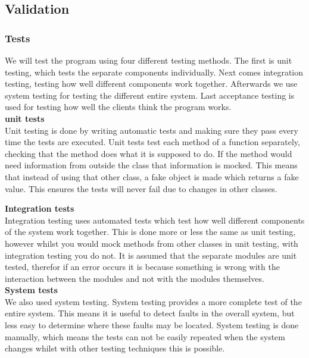 \subsection{Validation}

\subsubsection{Tests}
We will test the program using four different testing methods. The first is unit testing, which tests the separate components individually. Next comes integration testing, testing how well different components work together. Afterwards we use system testing for testing the different entire system. Last acceptance testing is used for testing how well the clients think the program works.\\

\textbf{unit tests}\\
Unit testing is done by writing automatic tests and making sure they pass every time the tests are executed. Unit tests test each method of a function separately, checking that the method does what it is supposed to do. If the method would need information from outside the class that information is mocked. This means that instead of using that other class, a fake object is made which returns a fake value. This ensures the tests will never fail due to changes in other classes. \\

\todo{}

\textbf{Integration tests}\\
Integration testing uses automated tests which test how well different components of the system work together. This is done more or less the same as unit testing, however whilst you would mock methods from other classes in unit testing, with integration testing you do not. It is assumed that the separate modules are unit tested, therefor if an error occurs it is because something is wrong with the interaction between the modules and not with the modules themselves. \\

\textbf{System tests}\\
We also used system testing. System testing provides a more complete test of the entire system. This means it is useful to detect faults in the overall system, but less easy to determine where these faults may be located. System testing is done manually, which means the tests can not be easily repeated when the system changes whilst with other testing techniques this is possible.\\

